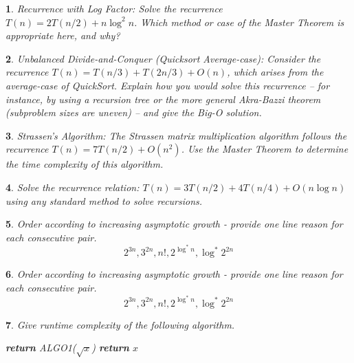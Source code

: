 \documentclass[%
addpoints]{exam}
\theoremstyle{problem}
\newtheorem{p}{}
\begin{document}
\begin{p}
Recurrence with Log Factor: Solve the recurrence \(T(n) = 2T(n/2) + n \log^2 n\). Which method or case of the Master Theorem is appropriate here, and why?  
\hfill\end{p}

\begin{p}
Unbalanced Divide-and-Conquer (Quicksort Average-case): Consider the recurrence \(T(n) = T(n/3) + T(2n/3) + O(n)\), which arises from the average-case of QuickSort. Explain how you would solve this recurrence – for instance, by using a recursion tree or the more general Akra-Bazzi theorem (subproblem sizes are uneven) – and give the Big-O solution.  
\hfill\end{p}

\begin{p}
Strassen's Algorithm: The Strassen matrix multiplication algorithm follows the recurrence \(T(n) = 7T(n/2) + O(n^2)\). Use the Master Theorem to determine the time complexity of this algorithm.  
\hfill\end{p}

\begin{p}
Solve the recurrence relation: \( T(n) = 3T(n/2) + 4T(n/4) + O(n \log n) \) using any standard method to solve recursions.
\hfill\end{p}

\begin{p}
Order according to increasing asymptotic growth - provide one line reason for each consecutive pair.
\[
2^{3n},3^{2n},n!,2^{\log^*n},\log^* 2^{2n}
\]
\hfill \end{p}

\begin{p}
Order according to increasing asymptotic growth - provide one line reason for each consecutive pair.
\[
2^{3n},3^{2n},n!,2^{\log^*n},\log^* 2^{2n}
\]
\hfill \end{p}

\begin{p}
Give runtime complexity of the following algorithm.
\begin{algorithm}[!ht]
	\label{algo1}
	\begin{algorithmic}
		 
		\State \textbf{return} ALGO1($\sqrt{x}$)
		\Else
		\State \textbf{return} $x$
		\EndIf
		\EndProcedure
	\end{algorithmic}
\end{algorithm}
\hfill \end{p}
\end{document}

